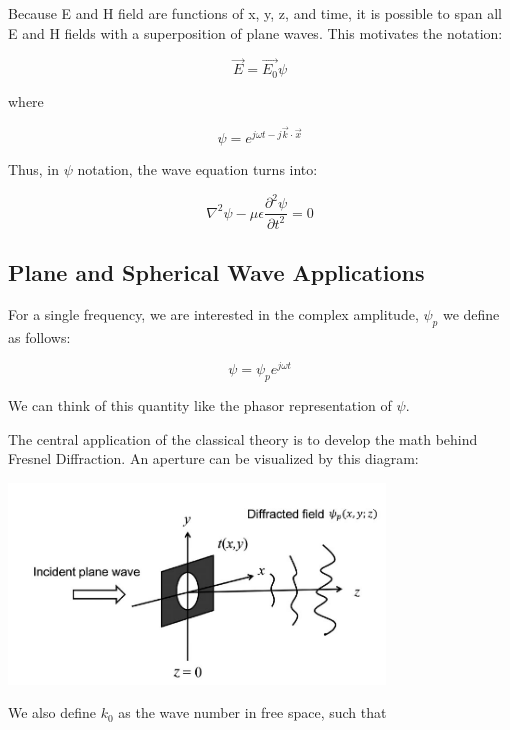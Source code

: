 \documentclass[12pt]{article}
\begin{document}
Because E and H field are functions of x, y, z, and time, it is possible to span all E and H fields with a superposition of plane waves. This motivates the notation:

\begin{equation}
	\vec{E} = \vec{E_{0}}\psi
\end{equation}

where

\begin{equation}
	\psi = e^{j \omega t - j\vec{k} \cdot \vec{x}}
\end{equation}

Thus, in \(\psi\) notation, the wave equation turns into:

\begin{equation}
	\nabla^2\psi - \mu\epsilon\frac{\partial^2\psi}{\partial t^2} = 0
\end{equation}

\subsection{Plane and Spherical Wave Applications}

For a single frequency, we are interested in the complex amplitude, \(\psi_{p}\) we define as follows:

\begin{equation}
	\psi = \psi_{p}e^{j \omega t}
\end{equation}

We can think of this quantity like the phasor representation of \(\psi\).

The central application of the classical theory is to develop the math behind Fresnel Diffraction. An aperture can be visualized by this diagram:
\begin{center}
\includegraphics[width=100mm]{tupac5.png}
\end{center}

We also define \(k_{0}\) as the wave number in free space, such that
\end{document}
